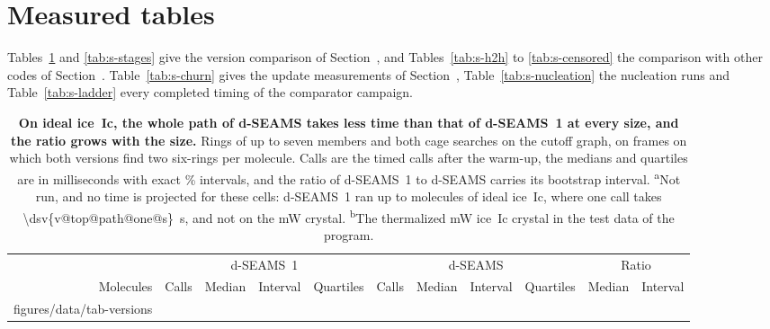 \documentclass[preprint,12pt]{elsarticle}
\makeatletter
\newcommand{\tabbody}[1]{\@@input #1 }
\makeatother
\begin{document}
\section{Measured tables}
\label{sec:s-tables}

Tables~\ref{tab:s-versions} and \ref{tab:s-stages} give the version
comparison of Section~, and Tables~\ref{tab:s-h2h} to
\ref{tab:s-censored} the comparison with other codes of
Section~.
Table~\ref{tab:s-churn} gives the update measurements of
Section~, Table~\ref{tab:s-nucleation} the nucleation
runs and Table~\ref{tab:s-ladder} every completed timing of the
comparator campaign.

\begin{table}
\centering
\caption{\textbf{On ideal ice~Ic, the whole path of d-SEAMS takes less time than that of d-SEAMS~1 at every size, and the ratio grows with the size.}
Rings of up to seven members and both cage searches on the cutoff graph,
on frames on which both versions find two six-rings per molecule. Calls
are the timed calls after the warm-up, the medians and quartiles are in
milliseconds with exact \% intervals, and the
ratio of d-SEAMS~1 to d-SEAMS carries its bootstrap interval.
\textsuperscript{a}Not run, and no time is projected for these cells:
d-SEAMS~1 ran up to  molecules of ideal ice~Ic, where one
call takes \qty{\dsv{v@top@path@one@s}}{\second}, and not on the mW
crystal. \textsuperscript{b}The thermalized mW ice~Ic crystal in the
test data of the program.}
\label{tab:s-versions} \footnotesize \setlength{\tabcolsep}{3pt}
\begin{tabular}{@{}rrrccrrccrc@{}}
\toprule
 & \multicolumn{4}{c}{d-SEAMS~1} & \multicolumn{4}{c}{d-SEAMS} & \multicolumn{2}{c}{Ratio} \\
\cmidrule(lr){2-5}\cmidrule(lr){6-9}\cmidrule(l){10-11}
Molecules & Calls & Median & Interval & Quartiles & Calls & Median & Interval & Quartiles & Median & Interval \\
\midrule
\tabbody{figures/data/tab-versions}
\bottomrule
\end{tabular}


\end{table}
\end{document}
